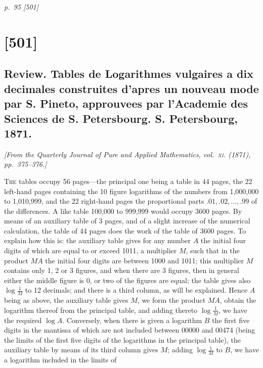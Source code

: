\documentclass[11pt,a4paper]{article}
\newcommand{\sourcepage}[2]{%
  \bigskip
  \noindent\textit{p.~#1 [#2]}%
  \par\smallskip
}
\newcommand{\papersection}[2]{%
  \section{[#1]}
  \subsection{#2}
}
\newcommand{\fromjournal}[1]{%
  \begin{center}\textit{#1}\end{center}
}
\begin{document}
\sourcepage{95}{501}
\papersection{501}{Review. Tables de Logarithmes vulgaires a dix decimales construites d'apres un nouveau mode par S. Pineto, approuvees par l'Academie des Sciences de S. Petersbourg. S. Petersbourg, 1871.}

\fromjournal{[From the Quarterly Journal of Pure and Applied Mathematics, vol.~\textsc{xi}. (1871), pp.~375--376.]}

\textsc{The} tables occupy 56 pages---the principal one being a table in 44 pages,
the 22 left-hand pages containing the 10 figure logarithms of the numbers from
1,000,000 to 1,010,999, and the 22 right-hand pages the proportional parts
$.01,.02,\ldots,.99$ of the differences. A like table 100,000 to 999,999 would
occupy 3600 pages. By means of an auxiliary table of 3 pages, and of a slight
increase of the numerical calculation, the table of 44 pages does the work of the
table of 3600 pages. To explain how this is: the auxiliary table gives for any
number $A$ the initial four digits of which are equal to or exceed 1011, a multiplier
$M$, such that in the product $MA$ the initial four digits are between 1000 and
1011; this multiplier $M$ contains only 1, 2 or 3 figures, and when there are 3
figures, then in general either the middle figure is 0, or two of the figures are equal;
the table gives also $\log \frac1M$ to 12 decimals; and there is a third column, as
will be explained. Hence $A$ being as above, the auxiliary table gives $M$, we form
the product $MA$, obtain the logarithm thereof from the principal table, and adding
thereto $\log \frac1M$, we have the required $\log A$. Conversely, when there is
given a logarithm $B$ the first five digits in the mantissa of which are not included
between 00000 and 00474 (being the limits of the first five digits of the logarithms
in the principal table), the auxiliary table by means of its third column gives $M$;
adding $\log \frac1M$ to $B$, we have a logarithm included in the limits of
\end{document}
